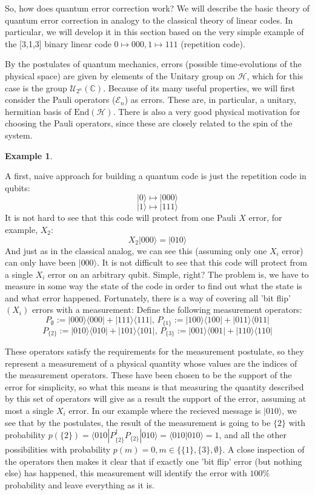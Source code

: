 \documentclass[12pt,a4paper,BCOR15mm,twoside,DIV12]{article}
\def\E{\mathcal{E}}
\def\C{\mathbb{C}}
\def\End{\text{End}}
\def\H{\mathcal{H}}
\theoremstyle{definition}
\newtheorem{ex}[Satz]{Example}
\begin{document}
So, how does quantum error correction work? We will describe the basic theory of quantum error correction in analogy to the classical theory of linear codes. In particular, we will develop it in this section based on the very simple example of the [3,1,3] binary linear code $ 0 \mapsto 000, 1 \mapsto 111$ (repetition code).

By the postulates of quantum mechanics, errors (possible time-evolutions of the physical space) are given by elements of the Unitary group on $\mathcal{H}$, which for this case is the group $\mathcal{U}_{2^n}(\C)$.
Because of its many useful properties, we will first consider the Pauli operators ($\E_n$) as errors. These are, in particular, a unitary, hermitian basis of $\End(\H)$. There is also a very good physical motivation for choosing the Pauli operators, since these are closely related to the spin of the system.

\begin{ex} \label{repetitionqubits}

  A first, naive approach for building a quantum code is just the repetition code in qubits: 
  \[ |0\rangle \mapsto |000\rangle \]
  \[ |1\rangle \mapsto |111\rangle \]
  It is not hard to see that this code will protect from one Pauli $X$ error, for example, $X_2$:
  \[ X_2 |000 \rangle = |010 \rangle \]
  And just as in the classical analog, we can see this (assuming only one $X_i$ error) can only have been $|000 \rangle$. It is not difficult to see that this code will protect from a single $X_i$ error on an arbitrary qubit.
  Simple, right? The problem is, we have to measure in some way the state of the code in order to find out what the state is and what error happened. Fortunately, there is a way of covering all 'bit flip' $(X_i)$ errors with a measurement:
  Define the following measurement operators: 
  \[ P_\emptyset := |000\rangle \langle 000 | + |111\rangle \langle 111 | \text{,    } P_{\{1\}} := |100\rangle \langle 100 | + |011\rangle \langle 011 | \]
  \[ P_{\{2\}} := |010\rangle \langle 010 | + |101\rangle \langle 101 | \text{,    } P_{\{3\}} := |001\rangle \langle 001 | + |110\rangle \langle 110 | \]

  These operators satisfy the requirements for the measurement postulate, so they represent a measurement of a physical quantity whose values are the indices of the measurement operators. These have been chosen to be the support of the error for simplicity,
so what this means is that measuring the quantity described by this set of operators will give as a result the support of the error, assuming at most a single $X_i$ error. In our example where the recieved message is $ |010 \rangle$, 
we see that by the postulates, the result of the measurement is going to be $\{2 \}$ with probability $p(\{2 \}) = \langle 010 | P_{\{2\}}^\dagger P_{\{2\}} | 010 \rangle = \langle 010 | 010 \rangle = 1$, and all the other possibilities with probability $p(m) = 0, m \in \{ \{1 \}, \{3 \}, \emptyset \}$.
A close inspection of the operators then makes it clear that if exactly one 'bit flip' error (but nothing else) has happened, this measurement will identify the error with $100\%$ probability and leave everything as it is.
\end{ex}
\end{document}
